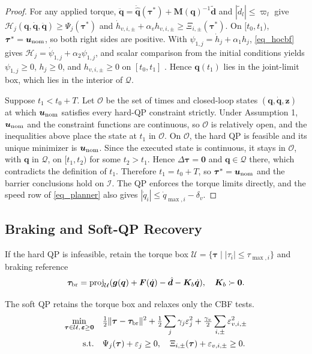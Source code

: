 \begin{proof}
For any applied torque, $\ddot{\bm q}=\ddot{\hat{\bm q}}(\bm\tau^*)+\bm M(\bm q)^{-1}\tilde{\bm d}$ and $|\tilde d_l|\le\varpi_l$ give $\mathcal H_j(\bm q,\dot{\bm q},\ddot{\bm q})\ge\Psi_j(\bm\tau^*)$ and $\dot h_{v,i,\pm}+\alpha_vh_{v,i,\pm}\ge\Xi_{i,\pm}(\bm\tau^*)$. On $[t_0,t_1)$, $\bm\tau^*=\bm u_{\rm nom}$, so both right sides are positive. With $\psi_{1,j}=\dot h_j+\alpha_1h_j$, \eqref{eq_hocbf} gives $\mathcal H_j=\dot\psi_{1,j}+\alpha_2\psi_{1,j}$, and scalar comparison from the initial conditions yields $\psi_{1,j}\ge0$, $h_j\ge0$, and $h_{v,i,\pm}\ge0$ on $[t_0,t_1]$ \cite{r7,r8}. Hence $\bm q(t_1)$ lies in the joint-limit box, which lies in the interior of $\mathcal Q$.

Suppose $t_1<t_0+T$. Let $\mathcal O$ be the set of times and closed-loop states $(\bm q,\dot{\bm q},\bm z)$ at which $\bm u_{\rm nom}$ satisfies every hard-QP constraint strictly. Under Assumption 1, $\bm u_{\rm nom}$ and the constraint functions are continuous, so $\mathcal O$ is relatively open, and the inequalities above place the state at $t_1$ in $\mathcal O$. On $\mathcal O$, the hard QP is feasible and its unique minimizer is $\bm u_{\rm nom}$. Since the executed state is continuous, it stays in $\mathcal O$, with $\bm q$ in $\mathcal Q$, on $[t_1,t_2)$ for some $t_2>t_1$. Hence $\Delta\bm\tau=\bm0$ and $\bm q\in\mathcal Q$ there, which contradicts the definition of $t_1$. Therefore $t_1=t_0+T$, so $\bm\tau^*=\bm u_{\rm nom}$ and the barrier conclusions hold on $\mathcal I$. The QP enforces the torque limits directly, and the speed row of \eqref{eq_planner} also gives $|\dot q_i|\le\dot q_{\max,i}-\delta_v$.
\end{proof}



\subsection{Braking and Soft-QP Recovery}
\label{subsec_recovery}

If the hard QP is infeasible, retain the torque box $\mathcal U=\{\bm\tau\mid|\tau_i|\le\tau_{\max,i}\}$ and braking reference
\begin{equation}
\bm\tau_{\rm br}=\operatorname{proj}_{\mathcal U}
(\bm g(\bm q)+\bm F(\dot{\bm q})-\hat{\bm d}-\bm K_b\dot{\bm q}),
\quad\bm K_b\succ\bm0.
\label{eq_brake}
\end{equation}

The soft QP retains the torque box and relaxes only the CBF tests.
\begin{equation}
\begin{aligned}
\min_{\bm\tau\in\mathcal U,\,\bm\varepsilon\ge\bm0}\quad
&\tfrac12\|\bm\tau-\bm\tau_{\rm br}\|^2
+\tfrac12\sum_j\gamma_j\varepsilon_j^2
+\tfrac{\gamma_v}{2}\sum_{i,\pm}\varepsilon_{v,i,\pm}^2\\
\mathrm{s.t.}\quad
&\Psi_j(\bm\tau)+\varepsilon_j\ge0,\quad
\Xi_{i,\pm}(\bm\tau)+\varepsilon_{v,i,\pm}\ge0.
\end{aligned}
\label{eq_fallback}
\end{equation}

